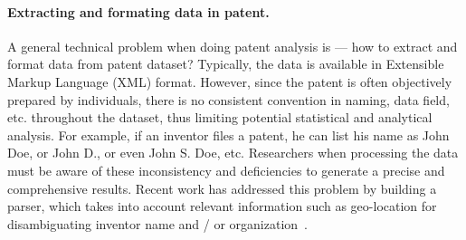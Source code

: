 \paragraph{Extracting and formating data in patent.}  A general technical
problem when doing patent analysis is --- how to extract and format data from
patent dataset? Typically, the data is available in Extensible Markup
Language (XML) format. However, since the patent is often objectively prepared
by individuals, there is no consistent convention in naming, data field,
etc. throughout the dataset, thus limiting potential statistical and
analytical analysis. For example, if an inventor files a patent, he can 
list his name as John Doe, or John D., or even John S. Doe, etc. Researchers when
processing the data must be aware of these inconsistency and deficiencies to
generate a precise and comprehensive results. Recent work has addressed this
problem by building a parser, which takes into account relevant information 
such as geo-location for disambiguating inventor name and / or organization~\cite{formattingpatentdata,
disambiguation, Torvik:2009}. 